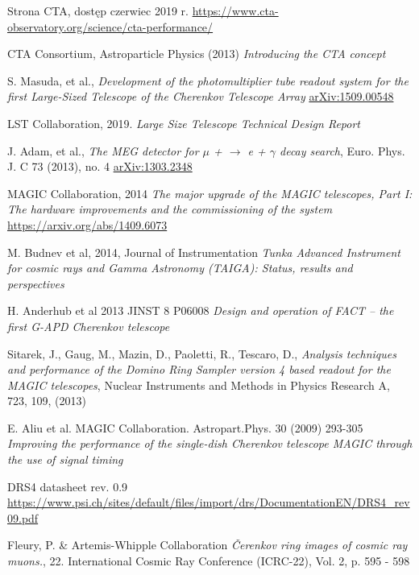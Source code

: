 \documentclass[a4paper,11pt,twoside]{article}
\begin{document}
\begin{thebibliography}{9}
Strona CTA, dostęp czerwiec 2019 r.
\url{https://www.cta-observatory.org/science/cta-performance/}

CTA Consortium, Astroparticle Physics (2013)
\textit{Introducing the CTA concept}

S. Masuda, et al., 
\textit{Development of the photomultiplier tube readout
system for the first Large-Sized Telescope of the
Cherenkov Telescope Array}
\url{arXiv:1509.00548}

LST Collaboration, 2019.
\textsl{Large Size Telescope Technical Design Report}

J. Adam, et al.,
\textit{The MEG detector for $\mu$ + $\rightarrow$ e + $\gamma$ decay search}, Euro. Phys. J. C 73 (2013), no. 4
\url{arXiv:1303.2348}

MAGIC Collaboration, 2014
\textit{The major upgrade of the MAGIC telescopes, Part I: The hardware improvements and the commissioning of the system}
\url{https://arxiv.org/abs/1409.6073}

M. Budnev et al, 2014, Journal of Instrumentation
\textit{Tunka Advanced Instrument for cosmic rays and Gamma Astronomy (TAIGA): Status, results and perspectives}

H. Anderhub et al 2013 JINST 8 P06008
\textit{Design and operation of FACT – the first G-APD
Cherenkov telescope}

Sitarek, J., Gaug, M., Mazin, D., Paoletti, R., Tescaro, D., \textit{Analysis techniques and performance of the Domino Ring Sampler version 4 based readout for the MAGIC
telescopes}, Nuclear Instruments and Methods in Physics Research A, 723, 109, (2013)

E. Aliu et al. MAGIC Collaboration. Astropart.Phys. 30 (2009) 293-305
\textit{Improving the performance of the single-dish
Cherenkov telescope MAGIC through the use
of signal timing}


DRS4 datasheet rev. 0.9
\url{https://www.psi.ch/sites/default/files/import/drs/DocumentationEN/DRS4_rev09.pdf}

Fleury, P. \& Artemis-Whipple Collaboration
\textit{Čerenkov ring images of cosmic ray muons.},
22. International Cosmic Ray Conference (ICRC-22), Vol. 2, p. 595 - 598

\end{thebibliography}

\endgroup
\end{document}
